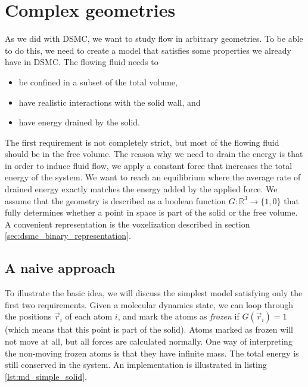 \section{Complex geometries}
\label{sec:md_complex_geometries}
As we did with DSMC, we want to study flow in arbitrary geometries.  To be able to do this, we need to create a model that satisfies some properties we already have in DSMC. The flowing fluid needs to
\begin{itemize}
	\item be confined in a subset of the total volume,
	\item have realistic interactions with the solid wall, and
	\item have energy drained by the solid.
\end{itemize}
The first requirement is not completely strict, but most of the flowing fluid should be in the free volume. The reason why we need to drain the energy is that in order to induce fluid flow, we apply a constant force that increases the total energy of the system. We want to reach an equilibrium where the average rate of drained energy exactly matches the energy added by the applied force. We assume that the geometry is described as a boolean function $G : \mathbb{R}^3\rightarrow \{1,0\}$ that fully determines whether a point in space is part of the solid or the free volume. A convenient representation is the voxelization described in section \ref{sec:dsmc_binary_representation}. 
\subsection{A naive approach}
To illustrate the basic idea, we will discuss the simplest model satisfying only the first two requirements. Given a molecular dynamics state, we can loop through the positions $\vec r_i$ of each atom $i$, and mark the atoms as \textit{frozen} if $G(\vec r_i) = 1$ (which means that this point is part of the solid). Atoms marked as frozen will not move at all, but all forces are calculated normally. One way of interpreting the non-moving frozen atoms is that they have infinite mass. The total energy is still conserved in the system. An implementation is illustrated in listing \ref{lst:md_simple_solid}.

